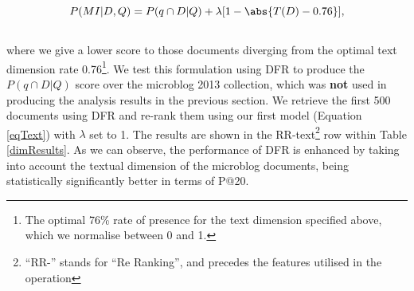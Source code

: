 \begin{equation}
P(MI|D,Q) = P(q \cap D|Q) + \lambda [1- \abs{T(D)-0.76}],
\label{eqText}
\end{equation}\\

\noindent where we give a lower score to those documents diverging from the optimal text dimension rate 0.76\footnote{The optimal 76\% rate of presence for the text dimension specified above, which we normalise between 0 and 1.}. We test this formulation using DFR to produce the \(P(q \cap D|Q)\) score over the microblog 2013 collection, which was \textbf{not} used in producing the analysis results in the previous section. We retrieve the first 500 documents using DFR and re-rank them using our first model (Equation \ref{eqText}) with \(\lambda\) set to 1. The results are shown in the RR-text\footnote{``RR-'' stands for ``Re Ranking'', and precedes the features utilised in the operation} row within Table \ref{dimResults}. As we can observe, the performance of DFR is enhanced by taking into account the textual dimension of the microblog documents, being statistically significantly better in terms of P@20.

